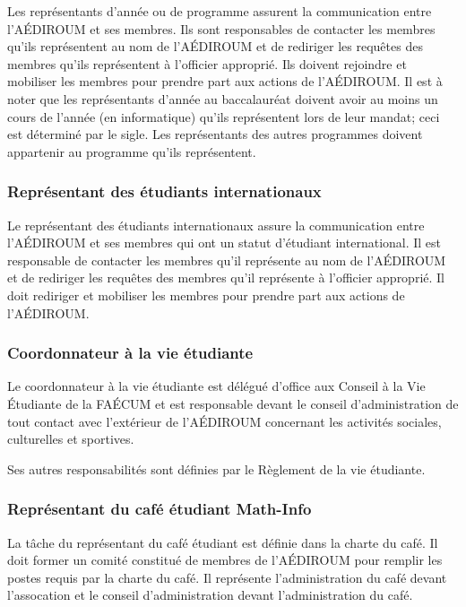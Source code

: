 \documentclass{aediroum}
\begin{document}
Les représentants d'année ou de programme assurent la communication entre l'AÉDIROUM et ses membres. Ils sont responsables de contacter les membres qu'ils représentent au nom de l'AÉDIROUM et de rediriger les requêtes des membres qu'ils représentent à l'officier approprié. Ils doivent rejoindre et mobiliser les membres pour prendre part aux actions de l'AÉDIROUM. Il est à noter que les représentants d'année au baccalauréat doivent avoir au moins un cours de l'année (en informatique) qu'ils représentent lors de leur mandat; ceci est déterminé par le sigle. Les représentants des autres programmes doivent appartenir au programme qu'ils représentent.

\subsubsection{Représentant des étudiants internationaux}\label{sec:representant-des-etudiants-internationaux}

Le représentant des étudiants internationaux assure la communication entre l'AÉDIROUM et ses membres qui ont un statut d'étudiant international. Il est responsable de contacter les membres qu'il représente au nom de l'AÉDIROUM et de rediriger les requêtes des membres qu'il représente à l'officier approprié. Il doit rediriger et mobiliser les membres pour prendre part aux actions de l'AÉDIROUM.

\subsubsection{Coordonnateur à la vie étudiante}\label{sec:coordonnateur-a-la-vie-etudiante}

Le coordonnateur à la vie étudiante est délégué d'office aux Conseil à la Vie Étudiante de la FAÉCUM et est responsable devant le conseil d'administration de tout contact avec l'extérieur de l'AÉDIROUM concernant les activités sociales, culturelles et sportives.

Ses autres responsabilités sont définies par le Règlement de la vie étudiante.

\subsubsection{Représentant du café étudiant Math-Info}\label{sec:representant-du-cafe-etudiant-math-info}

La tâche du représentant du café étudiant est définie dans la charte du café. Il doit former un comité constitué de membres de l'AÉDIROUM pour remplir les postes requis par la charte du café. Il représente l'administration du café devant l'assocation et le conseil d'administration devant l'administration du café.
\end{document}

